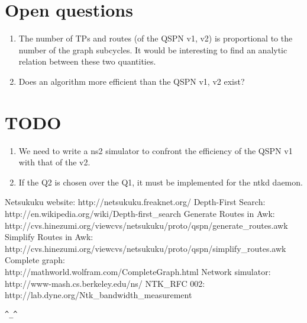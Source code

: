 \documentclass[a4paper]{article}
\newcommand{\href}[2]{ #1 }
\begin{document}
\section{Open questions}
\begin{enumerate}
	\item The number of TPs and routes (of the QSPN v1, v2) is
		proportional to the number of the graph subcycles. It would be
		interesting to find an analytic relation between these two
		quantities.
	\item Does an algorithm more efficient than the QSPN v1, v2 exist?
\end{enumerate}

\section{TODO}
\begin{enumerate}
	\item We need to write a ns2 \cite{ns2} simulator to confront the efficiency of the
		QSPN v1 with that of the v2.
	\item If the Q2 is chosen over the Q1, it must be implemented for the
		ntkd daemon.
\end{enumerate}


\begin{thebibliography}{99}
	 Netsukuku website:
		\href{http://netsukuku.freaknet.org/}{http://netsukuku.freaknet.org/}
	 Depth-First Search:
		\href{http://en.wikipedia.org/wiki/Depth-first\_search}{http://en.wikipedia.org/wiki/Depth-first\_search}
	 Generate Routes in Awk:
		\ifpdf \else \\ \fi
		\href{http://cvs.hinezumi.org/viewcvs/netsukuku/proto/qspn/generate\_routes.awk}{generate\_routes.awk}
	 Simplify Routes in Awk:
		\ifpdf \else \\ \fi
		\href{http://cvs.hinezumi.org/viewcvs/netsukuku/proto/qspn/simplify\_routes.awk}{simplify\_routes.awk}
	 Complete graph:
		\ifpdf \else \\ \fi
		\href{http://mathworld.wolfram.com/CompleteGraph.html}{http://mathworld.wolfram.com/}
	 Network simulator:
		\ifpdf \else \\ \fi
		\href{http://www-mash.cs.berkeley.edu/ns/}{http://www-mash.cs.berkeley.edu/ns/}
	 NTK\_RFC 002:
		\href{http://lab.dyne.org/Ntk\_bandwidth\_measurement}{Bandwidth
		measurement}
\end{thebibliography}
\newpage

\begin{center}
\verb|^_^|
\end{center}
\end{document}
